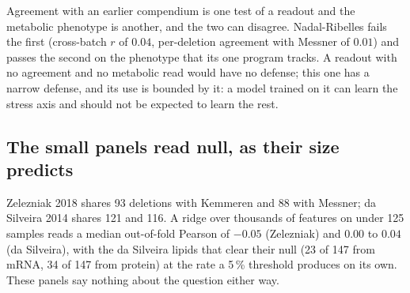  Agreement with an earlier compendium
is one test of a readout and the metabolic phenotype is another, and the two can
disagree. Nadal-Ribelles fails the first (cross-batch $r$ of $0.04$, per-deletion
agreement with Messner of $0.01$) and passes the second on the phenotype that its one
program tracks. A readout with no agreement and no metabolic read would have no
defense; this one has a narrow defense, and its use is bounded by it: a model trained
on it can learn the stress axis and should not be expected to learn the rest.

\subsection{The small panels read null, as their size predicts}
\label{sec:findings-small}

Zelezniak 2018 shares 93 deletions with Kemmeren and 88 with Messner; da Silveira 2014
shares 121 and 116. A ridge over thousands of features on under 125 samples reads a
median out-of-fold Pearson of $-0.05$ (Zelezniak) and $0.00$ to $0.04$ (da Silveira),
with the da Silveira lipids that clear their null (23 of 147 from mRNA, 34 of 147 from
protein) at the rate a 5\,\% threshold produces on its own. These panels say nothing
about the question either way.
